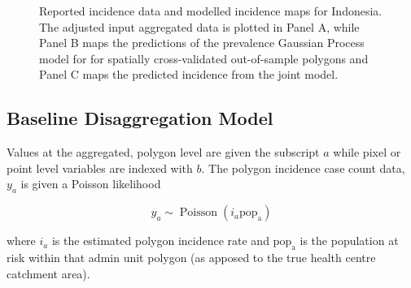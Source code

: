 \documentclass{statsoc}
\begin{document}
\begin{figure}[h!]
\caption{\label{predobsmapidn}
Reported incidence data and modelled incidence maps for Indonesia. 
The adjusted input aggregated data is plotted in Panel A, while Panel B maps the predictions of the prevalence Gaussian Process model for for spatially cross-validated out-of-sample polygons and Panel C maps the predicted incidence from the joint model.
}
\end{figure}



\subsection*{Baseline Disaggregation Model}

Values at the aggregated, polygon level are given the subscript $a$ while pixel or point level variables are indexed with $b$.
The polygon incidence case count data, $y_a$ is given a Poisson likelihood

$$y_a \sim \operatorname{Poisson}(i_a\mathrm{pop_a})$$

where $i_a$ is the estimated polygon incidence rate and $\mathrm{pop_a}$ is the population at risk within that admin unit polygon (as apposed to the true health centre catchment area).
\end{document}
